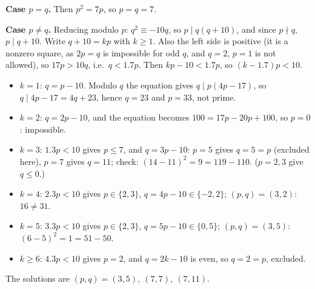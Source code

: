 \textbf{Case $p=q$.} Then $p^2=7p$, so $p=q=7$.

\textbf{Case $p\ne q$.} Reducing modulo $p$: $q^2\equiv-10q$, so $p\mid q(q+10)$, and since $p\nmid q$, $p\mid q+10$. Write $q+10=kp$ with $k\ge1$. Also the left side is positive (it is a nonzero square, as $2p=q$ is impossible for odd $q$, and $q=2$, $p=1$ is not allowed), so $17p>10q$, i.e.\ $q<1.7p$. Then $kp-10<1.7p$, so $(k-1.7)p<10$.
\begin{itemize}
\item $k=1$: $q=p-10$. Modulo $q$ the equation gives $q\mid p(4p-17)$, so $q\mid4p-17=4q+23$, hence $q=23$ and $p=33$, not prime.
\item $k=2$: $q=2p-10$, and the equation becomes $100=17p-20p+100$, so $p=0$: impossible.
\item $k=3$: $1.3p<10$ gives $p\le7$, and $q=3p-10$: $p=5$ gives $q=5=p$ (excluded here), $p=7$ gives $q=11$; check: $(14-11)^2=9=119-110$. \checkmark ($p=2,3$ give $q\le0$.)
\item $k=4$: $2.3p<10$ gives $p\in\{2,3\}$, $q=4p-10\in\{-2,2\}$; $(p,q)=(3,2)$: $16\ne31$.
\item $k=5$: $3.3p<10$ gives $p\in\{2,3\}$, $q=5p-10\in\{0,5\}$; $(p,q)=(3,5)$: $(6-5)^2=1=51-50$. \checkmark
\item $k\ge6$: $4.3p<10$ gives $p=2$, and $q=2k-10$ is even, so $q=2=p$, excluded.
\end{itemize}
The solutions are $\boxed{(p,q)=(3,5),\ (7,7),\ (7,11)}$.
